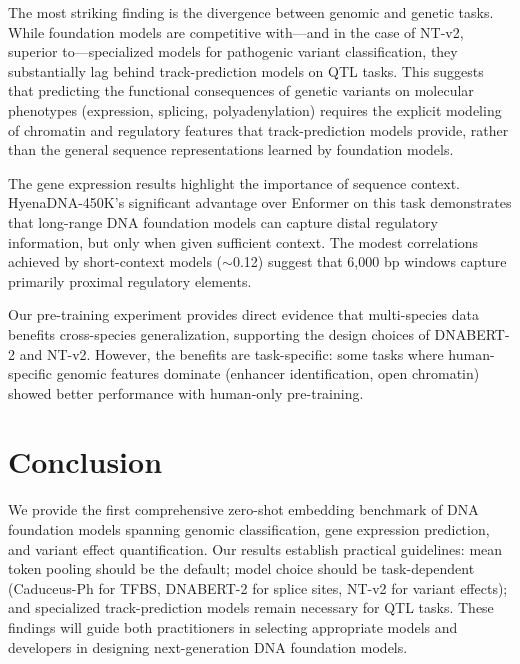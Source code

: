 \documentclass[11pt]{article}
\begin{document}
The most striking finding is the divergence between genomic and genetic tasks. While foundation models are competitive with---and in the case of NT-v2, superior to---specialized models for pathogenic variant classification, they substantially lag behind track-prediction models on QTL tasks. This suggests that predicting the functional consequences of genetic variants on molecular phenotypes (expression, splicing, polyadenylation) requires the explicit modeling of chromatin and regulatory features that track-prediction models provide, rather than the general sequence representations learned by foundation models.

The gene expression results highlight the importance of sequence context. HyenaDNA-450K's significant advantage over Enformer on this task demonstrates that long-range DNA foundation models can capture distal regulatory information, but only when given sufficient context. The modest correlations achieved by short-context models ($\sim$0.12) suggest that 6,000 bp windows capture primarily proximal regulatory elements.

Our pre-training experiment provides direct evidence that multi-species data benefits cross-species generalization, supporting the design choices of DNABERT-2 and NT-v2. However, the benefits are task-specific: some tasks where human-specific genomic features dominate (enhancer identification, open chromatin) showed better performance with human-only pre-training.

\section{Conclusion}

We provide the first comprehensive zero-shot embedding benchmark of DNA foundation models spanning genomic classification, gene expression prediction, and variant effect quantification. Our results establish practical guidelines: mean token pooling should be the default; model choice should be task-dependent (Caduceus-Ph for TFBS, DNABERT-2 for splice sites, NT-v2 for variant effects); and specialized track-prediction models remain necessary for QTL tasks. These findings will guide both practitioners in selecting appropriate models and developers in designing next-generation DNA foundation models.



\end{document}
